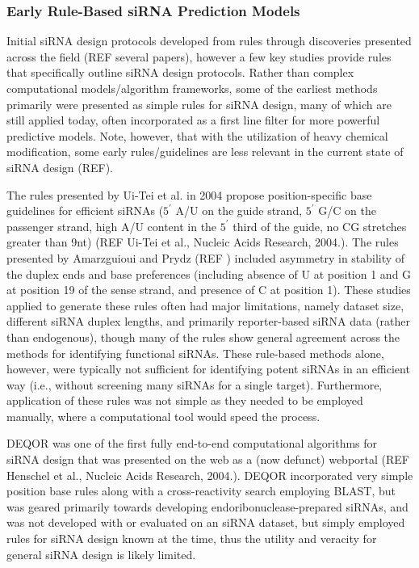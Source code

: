 \documentclass{report}
\begin{document}
\subsubsection{Early Rule-Based siRNA Prediction Models}

Initial siRNA design protocols developed from rules through discoveries presented across the field (REF several papers), however a few key studies provide rules that specifically outline siRNA design protocols. Rather than complex computational models/algorithm frameworks, some of the earliest methods primarily were presented as simple rules for siRNA design, many of which are still applied today, often incorporated as a first line filter for more powerful predictive models. Note, however, that with the utilization of heavy chemical modification, some early rules/guidelines are less relevant in the current state of siRNA design (REF). 

The rules presented by Ui-Tei et al. in 2004 propose position-specific base guidelines for efficient siRNAs ($5^\prime$ A/U on the guide strand, $5^\prime$ G/C on the passenger strand, high A/U content in the $5^\prime$ third of the guide, no CG stretches greater than 9nt) (REF Ui-Tei et al., Nucleic Acids Research, 2004.). The rules presented by Amarzguioui and Prydz (REF ) included asymmetry in stability of the duplex ends and base preferences (including absence of U at position 1 and G at position 19 of the sense strand, and presence of C at position 1). These studies applied to generate these rules often had major limitations, namely dataset size, different siRNA duplex lengths, and primarily reporter-based siRNA data (rather than endogenous), though many of the rules show general agreement across the methods for identifying functional siRNAs. These rule-based methods alone, however, were typically not sufficient for identifying potent siRNAs in an efficient way (i.e., without screening many siRNAs for a single target). Furthermore, application of these rules was not simple as they needed to be employed manually, where a computational tool would speed the process.

DEQOR was one of the first fully end-to-end computational algorithms for siRNA design that was presented on the web as a (now defunct) webportal (REF Henschel et al., Nucleic Acids Research, 2004.). DEQOR incorporated very simple position base rules along with a cross-reactivity search employing BLAST, but was geared primarily towards developing endoribonuclease-prepared siRNAs, and was not developed with or evaluated on an siRNA dataset, but simply employed rules for siRNA design known at the time, thus the utility and veracity for general siRNA design is likely limited.
\end{document}
